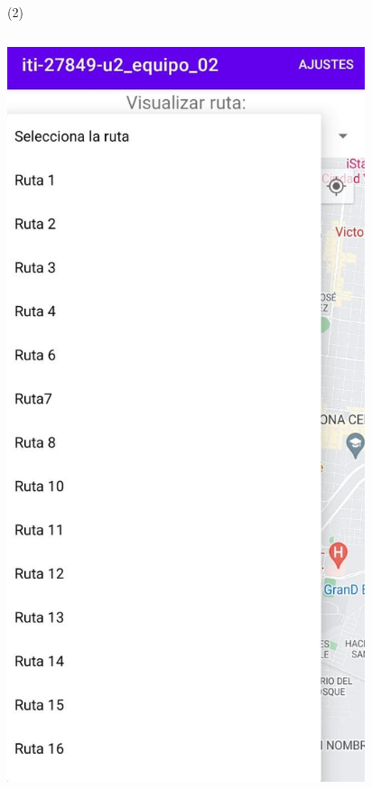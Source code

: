 \begin{frame}{ (2)}
\begin{columns}
\begin{column}{0.25\textwidth}  
\includegraphics[width=0.82\textwidth]{2022_MapaVickyRanch/figs/F3}
\end{column}
\begin{column}{0.25\textwidth}  

\end{column}
\end{columns}
\end{frame}
